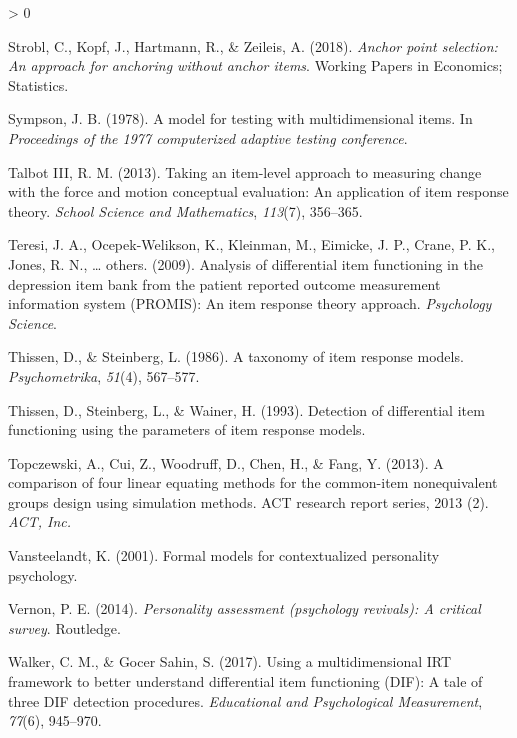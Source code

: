 \documentclass[
  english,
  man,floatsintext]{apa6}
\newlength{\cslhangindent}
\newenvironment{CSLReferences}[2] %
 {%
  \setlength{\parindent}{0pt}
  \ifodd #1 \everypar{\setlength{\hangindent}{\cslhangindent}}\ignorespaces\fi
  \ifnum #2 > 0
  \setlength{\parskip}{#2\baselineskip}
  \fi
 }%
 {}
\begin{document}
\begin{CSLReferences}{1}{0}
\leavevmode\hypertarget{ref-strobl2018anchor}{}%
Strobl, C., Kopf, J., Hartmann, R., \& Zeileis, A. (2018). \emph{Anchor point selection: An approach for anchoring without anchor items}. Working Papers in Economics; Statistics.

\leavevmode\hypertarget{ref-sympson1978model}{}%
Sympson, J. B. (1978). A model for testing with multidimensional items. In \emph{Proceedings of the 1977 computerized adaptive testing conference}.

\leavevmode\hypertarget{ref-talbot2013taking}{}%
Talbot III, R. M. (2013). Taking an item-level approach to measuring change with the force and motion conceptual evaluation: An application of item response theory. \emph{School Science and Mathematics}, \emph{113}(7), 356--365.

\leavevmode\hypertarget{ref-teresi2009analysis}{}%
Teresi, J. A., Ocepek-Welikson, K., Kleinman, M., Eimicke, J. P., Crane, P. K., Jones, R. N., \ldots{} others. (2009). Analysis of differential item functioning in the depression item bank from the patient reported outcome measurement information system (PROMIS): An item response theory approach. \emph{Psychology Science}.

\leavevmode\hypertarget{ref-thissen1986taxonomy}{}%
Thissen, D., \& Steinberg, L. (1986). A taxonomy of item response models. \emph{Psychometrika}, \emph{51}(4), 567--577.

\leavevmode\hypertarget{ref-thissen1993detection}{}%
Thissen, D., Steinberg, L., \& Wainer, H. (1993). Detection of differential item functioning using the parameters of item response models.

\leavevmode\hypertarget{ref-topczewski2013comparison}{}%
Topczewski, A., Cui, Z., Woodruff, D., Chen, H., \& Fang, Y. (2013). A comparison of four linear equating methods for the common-item nonequivalent groups design using simulation methods. ACT research report series, 2013 (2). \emph{ACT, Inc.}

\leavevmode\hypertarget{ref-vansteelandt2001formal}{}%
Vansteelandt, K. (2001). Formal models for contextualized personality psychology.

\leavevmode\hypertarget{ref-vernon2014personality}{}%
Vernon, P. E. (2014). \emph{Personality assessment (psychology revivals): A critical survey}. Routledge.

\leavevmode\hypertarget{ref-walker2017using}{}%
Walker, C. M., \& Gocer Sahin, S. (2017). Using a multidimensional IRT framework to better understand differential item functioning (DIF): A tale of three DIF detection procedures. \emph{Educational and Psychological Measurement}, \emph{77}(6), 945--970.


\end{CSLReferences}
\end{document}
